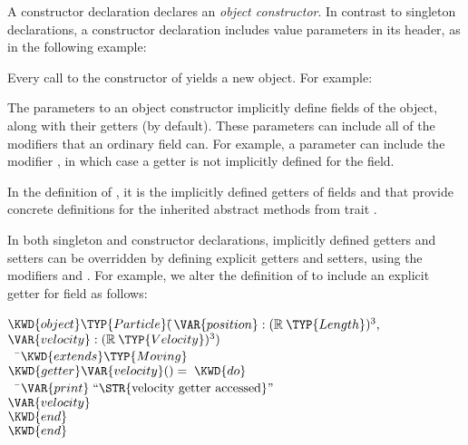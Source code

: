 


A constructor declaration declares an \emph{object constructor}.
In contrast to singleton declarations, a constructor declaration includes
value parameters in its header, as in the following example:
\label{particleDim}


Every call to the constructor of  yields a new object.
For example:


The parameters to an object constructor implicitly define
fields of the object, along with their getters (by default). These parameters
can include all of the modifiers that an ordinary field can. For example,
a parameter can include the modifier , in which case a getter
is not implicitly defined for the field.

In the definition of , it is the implicitly defined getters of
fields  and  that provide concrete definitions
for the inherited abstract methods from trait .

In both singleton and constructor declarations,
implicitly defined getters and setters can be overridden by defining
explicit getters and setters,
using the modifiers  and . For example,
we alter the definition
of  to include an explicit
getter for field  as follows:

\begin{Fortress}
\(\KWD{object} \TYP{Particle}(\null\)\pushtabs\=\+\(\VAR{position} \mathrel{\mathtt{:}} (\mathbb{R}\mskip 4mu plus 4mu\TYP{Length})^{3},\)\\
\(                \VAR{velocity} \mathrel{\mathtt{:}} (\mathbb{R}\mskip 4mu plus 4mu\TYP{Velocity})^{3})\)\-\\\poptabs
{\tt~~}\pushtabs\=\+\(  \KWD{extends} \TYP{Moving}\)\\
\(  \KWD{getter} \VAR{velocity}() = \;\KWD{do}\)\\
{\tt~~}\pushtabs\=\+\(    \VAR{print}\;\hbox{\rm``\STR{velocity~getter~accessed}''}\)\\
\(    \VAR{velocity}\)\-\\\poptabs
\(  \KWD{end}\)\-\\\poptabs
\(\KWD{end}\)
\end{Fortress}

